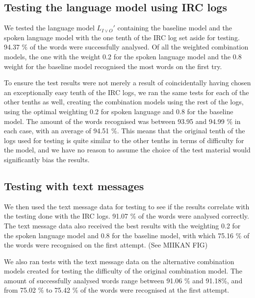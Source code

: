 \documentclass[a4paper,conference]{IEEEtran}
\begin{document}


\subsection{Testing the language model using IRC logs}

We tested the language model $L_{I\vee O}'$ containing the baseline model and the spoken language model with the one tenth of the IRC log set aside for testing. 94.37 \% of the words were successfully analysed. Of all the weighted combination models, the one with the weight 0.2 for the spoken language model and the 0.8 weight for the baseline model recognised the most words on the first try.

To ensure the test results were not merely a result of coincidentally having chosen an exceptionally easy tenth of the IRC logs, we ran the same tests for each of the other tenths as well, creating the combination models using the rest of the logs, using the optimal weighting 0.2 for spoken language and 0.8 for the baseline model. The amount of the words recognised was between 93.95 and 94.99 \% in each case, with an average of 94.51 \%. This means that the original tenth of the logs used for testing is quite similar to the other tenths in terms of difficulty for the model, and we have no reason to assume the choice of the test material would significantly bias the results.


\subsection{Testing with text messages}
 
We then used the text message data for testing to see if the results correlate with the testing done with the IRC logs. 91.07 \% of the words were analysed correctly. The text message data also received the best results with the weighting 0.2 for the spoken language model and 0.8 for the baseline model, with which 75.16 \% of the words were recognised on the first attempt. (See MIIKAN FIG)

We also ran tests with the text message data on the alternative combination models created for testing the difficulty of the original combination model. The amount of successfully analysed words range between 91.06 \% and 91.18\%, and from 75.02 \% to 75.42 \% of the words were recognised at the first attempt. 
\end{document}
